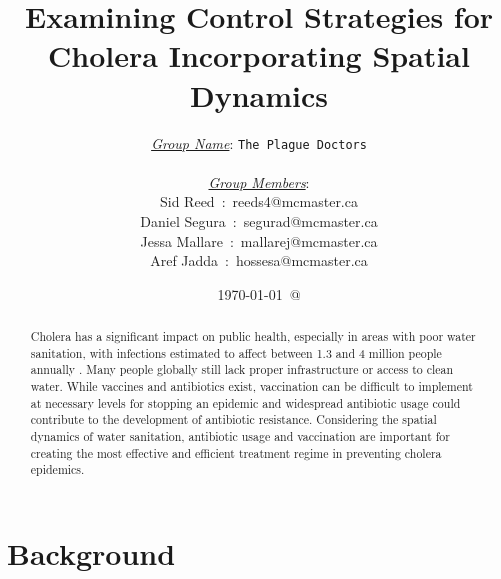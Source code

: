 \documentclass[12pt]{article}\usepackage[]{graphicx}\usepackage[]{color}
\begin{document}
\title{Examining Control Strategies for Cholera Incorporating Spatial Dynamics}
\author{
\underline{\emph{Group Name}}: \texttt{{\color{blue}The Plague Doctors}}\\\\
\underline{\emph{Group Members}}:\\
         Sid Reed\ :\ {\color{blue}reeds4@mcmaster.ca}\\
         Daniel Segura\ :\ {\color{blue}segurad@mcmaster.ca}\\
         Jessa Mallare\ :\ {\color{blue}mallarej@mcmaster.ca}\\
         Aref Jadda\ :\ {\color{blue}hossesa@mcmaster.ca}\\
}
\date{\today\ @ \thistime}
\maketitle

\begin{abstract}
    Cholera has a significant impact on public health, especially in areas with poor water sanitation, with infections estimated to affect between 1.3 and 4 million people annually \citep{link18}.
    Many people globally still lack proper infrastructure or access to clean water\citep{link19}.
    While vaccines and antibiotics exist, vaccination can be difficult to implement at necessary levels for stopping an epidemic and widespread antibiotic usage could contribute to the development of antibiotic resistance.
    Considering the spatial dynamics of water sanitation, antibiotic usage and vaccination are important for creating the most effective and efficient treatment regime in preventing cholera epidemics.
\end{abstract}

\clearpage

\clearpage
\tableofcontents
\clearpage

\section{Background}
\end{document}
